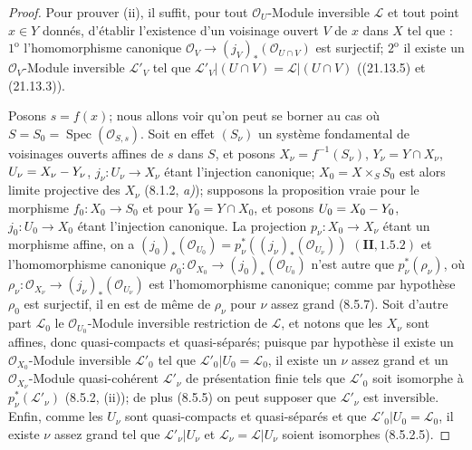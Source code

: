 \begin{proof}
Pour prouver (ii), il suffit, pour tout $\mathcal O_U$-Module inversible $\mathscr L$
et tout point $x\in Y$ donnés, d'établir l'existence d'un voisinage ouvert $V$ de $x$
dans $X$ tel que : $1^{\mathrm o}$ l'homomorphisme canonique
$\mathcal O_V\to(j_V)_*(\mathcal O_{U\cap V})$ est surjectif;
$2^{\mathrm o}$ il existe un $\mathcal O_V$-Module inversible $\mathscr L'_V$ tel que
$\mathscr L'_V|(U\cap V)=\mathscr L|(U\cap V)$ ((21.13.5) et (21.13.3)).

Posons $s=f(x)$; nous allons voir qu'on peut se borner au cas où
$S=S_0=\operatorname{Spec}(\mathcal O_{S,s})$. Soit en effet $(S_\nu)$ un système
fondamental de voisinages ouverts affines de $s$ dans $S$, et posons
$X_\nu=f^{-1}(S_\nu)$, $Y_\nu=Y\cap X_\nu$, $U_\nu=X_\nu- Y_\nu$,
$j_\nu:U_\nu\to X_\nu$ étant l'injection canonique; $X_0=X\times_S S_0$ est alors
limite projective des $X_\nu$ (8.1.2, \emph{a)}); supposons la proposition vraie pour le
morphisme $f_0:X_0\to S_0$ et pour $Y_0=Y\cap X_0$, et posons $U_0=X_0- Y_0$,
$j_0:U_0\to X_0$ étant l'injection canonique. La projection
$p_\nu:X_0\to X_\nu$ étant un morphisme affine, on a $(j_0)_*(\mathcal O_{U_0})=p_\nu^*((j_\nu)_*(\mathcal O_{U_\nu}))$
$(\mathbf{II}, 1.5.2)$ et l'homomorphisme canonique
$\rho_0:\mathcal O_{X_0}\to(j_0)_*(\mathcal O_{U_0})$ n'est autre que
$p_\nu^*(\rho_\nu)$, où
$\rho_\nu:\mathcal O_{X_\nu}\to(j_\nu)_*(\mathcal O_{U_\nu})$ est l'homomorphisme
canonique; comme par hypothèse $\rho_0$ est surjectif, il en est de même de $\rho_\nu$
pour $\nu$ assez
grand (8.5.7). Soit d'autre part $\mathscr L_0$ le
$\mathcal O_{U_0}$-Module inversible restriction de $\mathscr L$, et notons que les
$X_\nu$ sont affines, donc quasi-compacts et quasi-séparés; puisque par hypothèse il
existe un $\mathcal O_{X_0}$-Module inversible $\mathscr L'_0$ tel que
$\mathscr L'_0|U_0=\mathscr L_0$, il existe un $\nu$ assez grand et un
$\mathcal O_{X_\nu}$-Module quasi-cohérent $\mathscr L'_\nu$ de présentation finie
tels que $\mathscr L'_0$ soit isomorphe à $p_\nu^*(\mathscr L'_\nu)$ (8.5.2, (ii));
de plus (8.5.5) on peut supposer que $\mathscr L'_\nu$ est inversible. Enfin, comme
les $U_\nu$ sont quasi-compacts et quasi-séparés et que
$\mathscr L'_0|U_0=\mathscr L_0$, il existe $\nu$ assez grand tel que
$\mathscr L'_\nu|U_\nu$ et $\mathscr L_\nu=\mathscr L|U_\nu$ soient isomorphes (8.5.2.5).


\end{proof}
